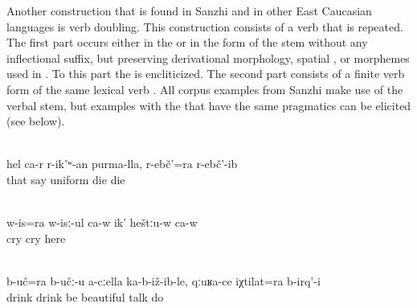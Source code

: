 Another construction that is found in Sanzhi and in other East Caucasian languages is verb doubling. This construction consists of a verb that is repeated. The first part occurs either in the  or in the form of the stem without any inflectional suffix, but preserving derivational morphology, spatial , or morphemes used in . To this part the   is encliticized. The second part consists of a finite verb form of the same lexical verb . All corpus examples from Sanzhi make use of the verbal stem, but examples with the  that have the same pragmatics can be elicited (see below).
%
\begin{exe}
	\\\label{ex:‎She herself said it in that manner}%
	\gll	hel	ca-r	r-ik'ʷ-an	purma-lla,	r-ebč'=ra	r-ebč'-ib\\
		that		say	uniform	\tsc{f-}die	die\\
	\glt	{}

	\\\label{ex:‎And as for crying, he is crying a lot here}%
	\gll	w-is=ra	w-isː-ul	ca-w	ik'	heštːu-w	ca-w\\
		cry	cry			here	\\
	\glt	{}

	\\\label{ex:As for drinking, they sit and drink with you, and (we) had nice conversations}%
	\gll	b-uč=ra	b-učː-u	a-cːella	ka-b-iž-ib-le, qːuʁa-ce	iχtilat=ra b-irq'-i\\
		drink	drink		be beautiful	talk	do\\
	\glt	{}
\end{exe}

